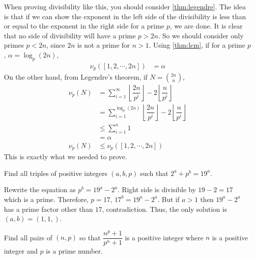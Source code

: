 \documentclass[problems.tex]{subfile}
\begin{document}
	\begin{solution}
		When proving divisibility like this, you should consider \autoref{thm:legendre}. The idea is that if we can show the exponent in the left side of the divisibility is less than or equal to the exponent in the right side for a prime $p$, we are done. It is clear that no side of divisibility will have a prime $p>2n$. So we should consider only primes $p<2n$, since $2n$ is not a prime for $n>1$. Using \autoref{thm:lcm}, if for a prime $p$, $\alpha =\log_p(2n)$,
			\begin{align*}
				\nu_p([1,2,\cdots,2n]) & = \alpha
			\end{align*}
		On the other hand, from Legendre's theorem, if $N=\binom{2n}n$,
			\begin{align*}
				\nu_p(N) & = \sum_{i=1}^{\infty}\left\lfloor\dfrac{2n}{p^i}\right\rfloor-2\left\lfloor\dfrac{n}{p^i}\right\rfloor\\
						 & = \sum_{i=1}^{\log_{p}(2n)}\left\lfloor\dfrac{2n}{p^i}\right\rfloor-2\left\lfloor\dfrac{n}{p^i}\right\rfloor\\
						 &\leq\sum_{i=1}^{a}1\\
						 & = \alpha \\
				\nu_p(N) &\leq\nu_p([1,2,\cdots,2n])
			\end{align*}
		This is exactly what we needed to prove.
	\end{solution}

	\begin{problem}
		Find all triples of positive integers $(a, b, p)$ such that $2^a+p^b=19^a$.
	\end{problem}

	\begin{solution}
		Rewrite the equation as $p^b=19^a-2^a$. Right side is divisible by $19-2=17$ which is a prime. Therefore, $p=17$, $17^b=19^a-2^a$. But if $a>1$ then $19^a-2^a$ has a prime factor other than $17$, contradiction. Thus, the only solution is $(a,b)=(1,1,)$.
	\end{solution}


	\begin{problem}
		Find all pairs of $(n, p)$ so that $\dfrac{n^p+1}{p^n+1}$ is a positive integer where $n$ is a positive integer and $p$ is a prime number.
	\end{problem}
\end{document}
